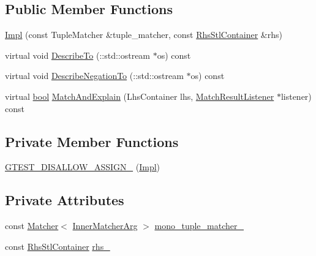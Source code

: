 \subsection*{Public Member Functions}
\begin{DoxyCompactItemize}
\item 
\hyperlink{classtesting_1_1internal_1_1PointwiseMatcher_1_1Impl_aaf6841b254ef78395919dfc5705dd152}{Impl} (const Tuple\+Matcher \&tuple\+\_\+matcher, const \hyperlink{classtesting_1_1internal_1_1PointwiseMatcher_aadbaec8c93351f29b103816c2e397edd}{Rhs\+Stl\+Container} \&rhs)
\item 
virtual void \hyperlink{classtesting_1_1internal_1_1PointwiseMatcher_1_1Impl_a0c699f62bbd02595471b793baa9cc75e}{Describe\+To} (\+::std\+::ostream $\ast$os) const
\item 
virtual void \hyperlink{classtesting_1_1internal_1_1PointwiseMatcher_1_1Impl_a26d3a829149e4c497aaced42aad7b247}{Describe\+Negation\+To} (\+::std\+::ostream $\ast$os) const
\item 
virtual \hyperlink{classbool}{bool} \hyperlink{classtesting_1_1internal_1_1PointwiseMatcher_1_1Impl_a4253946989f3743c4dd983909f2d062b}{Match\+And\+Explain} (Lhs\+Container lhs, \hyperlink{classtesting_1_1MatchResultListener}{Match\+Result\+Listener} $\ast$listener) const
\end{DoxyCompactItemize}
\subsection*{Private Member Functions}
\begin{DoxyCompactItemize}
\item 
\hyperlink{classtesting_1_1internal_1_1PointwiseMatcher_1_1Impl_adca4de21c6b463e552b347b28dce22c4}{G\+T\+E\+S\+T\+\_\+\+D\+I\+S\+A\+L\+L\+O\+W\+\_\+\+A\+S\+S\+I\+G\+N\+\_\+} (\hyperlink{classtesting_1_1internal_1_1PointwiseMatcher_1_1Impl}{Impl})
\end{DoxyCompactItemize}
\subsection*{Private Attributes}
\begin{DoxyCompactItemize}
\item 
const \hyperlink{classtesting_1_1Matcher}{Matcher}$<$ \hyperlink{classtesting_1_1internal_1_1PointwiseMatcher_1_1Impl_aba9d983881cbfbb37724b8b40e863898}{Inner\+Matcher\+Arg} $>$ \hyperlink{classtesting_1_1internal_1_1PointwiseMatcher_1_1Impl_ac94a851d56fe3f4f900da94cdc08c973}{mono\+\_\+tuple\+\_\+matcher\+\_\+}
\item 
const \hyperlink{classtesting_1_1internal_1_1PointwiseMatcher_aadbaec8c93351f29b103816c2e397edd}{Rhs\+Stl\+Container} \hyperlink{classtesting_1_1internal_1_1PointwiseMatcher_1_1Impl_a7f00c6c50d20c8c274428106b6c8e9ab}{rhs\+\_\+}
\end{DoxyCompactItemize}


